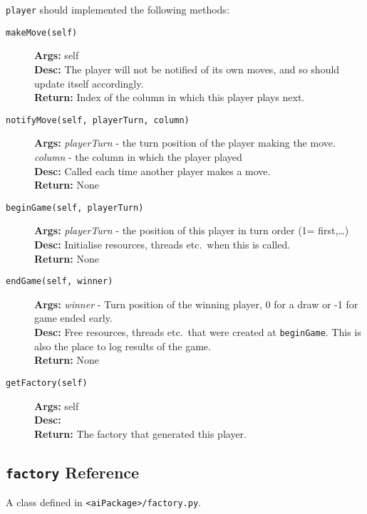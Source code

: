 \documentclass[a4paper,11pt]{article}
\newcommand{\MethodItem}[4]{\item[{\tt #1}]{\bf Args: }#2\\{\bf Desc: }#3\\{\bf Return: }#4}
\newcommand{\MethodArg}[2]{{\it #1} - #2}
\begin{document}
{\tt player} should implemented the following methods:
\begin{description}
\MethodItem{makeMove(self)}{self}{The player will not be notified of its own moves, and so should update itself accordingly.}{Index of the column in which this player plays next.}
\MethodItem{notifyMove(self, playerTurn, column)}{\MethodArg{playerTurn}{the turn position of the player making the move.}\\\MethodArg{column}{the column in which the player played}}{Called each time another player makes a move.}{None}
\MethodItem{beginGame(self, playerTurn)}{\MethodArg{playerTurn}{the position of this player in turn order (1= first,\ldots)}}{Initialise resources, threads etc.\ when this is called.}{None}
\MethodItem{endGame(self, winner)}{\MethodArg{winner}{Turn position of the winning player, 0 for a draw or -1 for game ended early.}}{Free resources, threads etc.\ that were created at {\tt beginGame}. This is also the place to log results of the game.}{None}
\MethodItem{getFactory(self)}{self}{}{The factory that generated this player.}
\end{description}

\subsection{{\tt factory} Reference}
A class defined in {\tt <aiPackage>/factory.py}.
\end{document}
